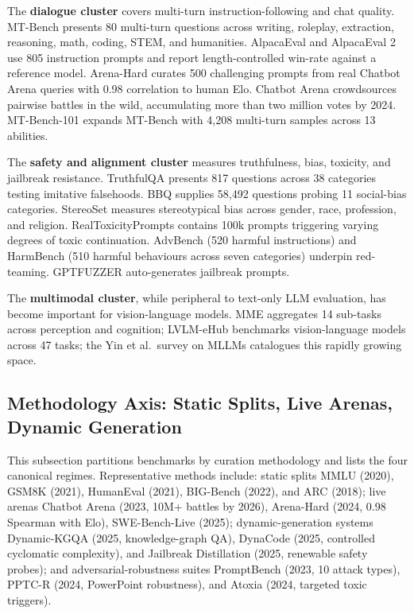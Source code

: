 \documentclass{article}
\begin{document}
The \textbf{dialogue cluster} covers multi-turn instruction-following and chat quality. MT-Bench \cite{zheng20232023} presents 80 multi-turn questions across writing, roleplay, extraction, reasoning, math, coding, STEM, and humanities. AlpacaEval and AlpacaEval 2 \cite{taori2023stanfordalpacaanin} use 805 instruction prompts and report length-controlled win-rate against a reference model. Arena-Hard \cite{li20242024} curates 500 challenging prompts from real Chatbot Arena queries with 0.98 correlation to human Elo. Chatbot Arena \cite{chiang20242024} crowdsources pairwise battles in the wild, accumulating more than two million votes by 2024. MT-Bench-101 \cite{bai20242024} expands MT-Bench with 4,208 multi-turn samples across 13 abilities.

The \textbf{safety and alignment cluster} measures truthfulness, bias, toxicity, and jailbreak resistance. TruthfulQA \cite{lin2022truthfulqameasurin} presents 817 questions across 38 categories testing imitative falsehoods. BBQ \cite{parrish20222022} supplies 58,492 questions probing 11 social-bias categories. StereoSet \cite{nadeem2021stereosetmeasuring} measures stereotypical bias across gender, race, profession, and religion. RealToxicityPrompts contains 100k prompts triggering varying degrees of toxic continuation. AdvBench (520 harmful instructions) and HarmBench (510 harmful behaviours across seven categories) underpin red-teaming. GPTFUZZER \cite{yu2023gptfuzzerredteamin} auto-generates jailbreak prompts.

The \textbf{multimodal cluster}, while peripheral to text-only LLM evaluation, has become important for vision-language models. MME \cite{fu20232023} aggregates 14 sub-tasks across perception and cognition; LVLM-eHub \cite{xu20232023} benchmarks vision-language models across 47 tasks; the Yin et al.~survey on MLLMs \cite{yin20232023} catalogues this rapidly growing space.

\subsection{Methodology Axis: Static Splits, Live Arenas, Dynamic Generation}\label{methodology-axis-static-splits-live-arenas-dynamic-generation}

This subsection partitions benchmarks by curation methodology and lists the four canonical regimes. Representative methods include: static splits MMLU (2020), GSM8K (2021), HumanEval (2021), BIG-Bench (2022), and ARC (2018); live arenas Chatbot Arena (2023, 10M+ battles by 2026), Arena-Hard (2024, 0.98 Spearman with Elo), SWE-Bench-Live (2025); dynamic-generation systems Dynamic-KGQA (2025, knowledge-graph QA), DynaCode (2025, controlled cyclomatic complexity), and Jailbreak Distillation (2025, renewable safety probes); and adversarial-robustness suites PromptBench (2023, 10 attack types), PPTC-R (2024, PowerPoint robustness), and Atoxia (2024, targeted toxic triggers).
\end{document}
